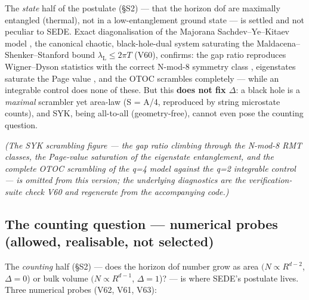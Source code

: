 \documentclass[11pt,a4paper]{article}
\begin{document}
The \emph{state} half of the postulate (§S2) --- that the horizon dof
are maximally entangled (thermal), not in a low-entanglement ground
state --- is settled and not peculiar to SEDE. Exact diagonalisation of
the Majorana Sachdev--Ye--Kitaev model
\citep{Sachdev:1992fk, Kitaev:2015}, the canonical chaotic,
black-hole-dual system saturating the Maldacena--Shenker--Stanford bound
\(\lambda _{\mathrm{L}} \leq  2\pi T\) \citep{Maldacena:2015waa} (V60),
confirms: the gap ratio reproduces Wigner--Dyson statistics with the
correct N-mod-8 symmetry class
\citep{GarciaGarcia:2016mno, Cotler:2016fpe, Atas:2012np}, eigenstates
saturate the Page value \citep{Page:1993df, Vidmar:2017pak}, and the
OTOC scrambles completely --- while an integrable control does none of
these. But this \textbf{does not fix \(\Delta\)}: a black hole is a
\emph{maximal} scrambler yet area-law (S = A/4, reproduced by string
microstate counts), and SYK, being all-to-all (geometry-free), cannot
even pose the counting question.

\emph{(The SYK scrambling figure --- the gap ratio climbing through the
N-mod-8 RMT classes, the Page-value saturation of the eigenstate
entanglement, and the complete OTOC scrambling of the q=4 model against
the q=2 integrable control --- is omitted from this version; the
underlying diagnostics are the verification-suite check V60 and
regenerate from the accompanying code.)}

\subsection{The counting question --- numerical probes (allowed,
realisable, not selected)}\label{sec-1-3}

The \emph{counting} half (§S2) --- does the horizon dof number grow as
area \((N \propto  R^{d-2}\), \(\Delta =0\)) or bulk volume
\((N \propto  R^{d-1}\), \(\Delta =1\))? --- is where SEDE's postulate
lives. Three numerical probes (V62, V61, V63):
\end{document}
